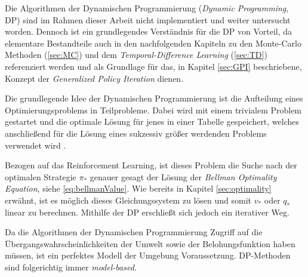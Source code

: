 Die Algorithmen der Dynamischen Programmierung (\textit{Dynamic Programming}, DP) sind im Rahmen dieser Arbeit nicht implementiert und weiter untersucht worden. Dennoch ist ein grundlegendes Verständnis für die DP von Vorteil, da elementare Bestandteile auch in den nachfolgenden Kapiteln zu den Monte-Carlo Methoden (\ref{sec:MC}) und dem \textit{Temporal-Difference Learning} (\ref{sec:TD}) referenziert werden und als Grundlage für das, in Kapitel \ref{sec:GPI} beschriebene, Konzept der \textit{Generalized Policy Iteration} dienen.
\par 
Die grundlegende Idee der Dynamischen Programmierung ist die Aufteilung eines Optimierungsproblems in Teilprobleme. Dabei wird mit einem trivialem Problem gestartet und die optimale Lösung für jenes in einer Tabelle gespeichert, welches anschließend für die Lösung eines sukzessiv größer werdenden Problems verwendet wird \cite[S.~243]{mehlhorn}.
\par 
Bezogen auf das Reinforcement Learning, ist dieses Problem die Suche nach der optimalen Strategie $\pi_*$ genauer gesagt der Lösung der \textit{Bellman Optimality Equation}, siehe \ref{eq:bellmanValue}. Wie bereits in Kapitel \ref{sec:optimality} erwähnt, ist es möglich dieses Gleichungssystem zu lösen und somit $v_*$ oder $q_*$ linear zu berechnen. Mithilfe der DP erschließt sich jedoch ein iterativer Weg.
\par 
Da die Algorithmen der Dynamischen Programmierung Zugriff auf die Übergangswahrscheinlichkeiten der Umwelt sowie der Belohungsfunktion haben müssen, ist ein perfektes Modell der Umgebung Voraussetzung. DP-Methoden sind folgerichtig immer \textit{model-based}.
\par

